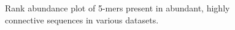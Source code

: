\documentclass[10pt]{article}
\begin{document}
\begin{figure}
\caption{Rank abundance plot of 5-mers present in abundant, highly connective sequences in various datasets.}
\end{figure}
\end{document}
